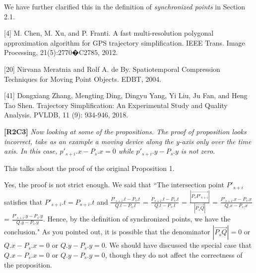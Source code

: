 \documentclass{letter}
\begin{document}
We have further clarified this in the definition of \emph{synchronized points} in Section 2.1.




[4] M. Chen, M. Xu, and P. Franti. A fast multi-resolution polygonal approximation algorithm for GPS trajectory
simplification. IEEE Trans. Image Processing, 21(5):2770�C2785, 2012.

[20] Nirvana Meratnia and Rolf A. de By. Spatiotemporal Compression Techniques for Moving Point Objects. EDBT, 2004.

[41] Dongxiang Zhang, Mengting Ding, Dingyu Yang, Yi Liu, Ju Fan, and Heng Tao Shen. Trajectory Simplification: An Experimental Study and Quality Analysis. PVLDB, 11 (9): 934-946, 2018.







\textbf{[R2C3]} \emph{Now looking at some of the propositions.
The proof of proposition looks incorrect, take as an example a moving device along the y-axis only over the time axis. In this case, $p'_{s+i}.x - P_s.x = 0$ while $p'_{s+i}.y - P_s.y$ is not zero.
}

This talks about the proof of the original Proposition 1.

Yes, the proof is not strict enough. We said that
``The intersection point $P'_{s+i}$ satisfies that $P'_{s+i}.t = P_{s+i}.t$ and
$\frac{P'_{s+i}.t - P_{s}.t}{Q.t - P_{s}.t}$ = $\frac{P_{s+i}.t - P_{s}.t}{Q.t - P_{s}.t}$  =
$\frac{|\overrightarrow{P_sP'_{s+i}}|}{|\overrightarrow{P_sQ}|}$ =
$\frac{P'_{s+i}.x - P_{s}.x}{Q.x - P_{s}.x}$ =
$\frac{P'_{s+i}.y - P_{s}.y}{Q.y - P_{s}.y}$.
Hence, by the definition of synchronized points, we have the conclusion."
As you pointed out, it is possible that the denominator $|\overrightarrow{P_sQ}|=0$ or $Q.x - P_{s}.x=0$ or $Q.y - P_{s}.y=0$. We should have discussed the special case that $Q.x - P_{s}.x=0$ or $Q.y - P_{s}.y=0$, though they do not affect the correctness of the proposition.
\end{document}

